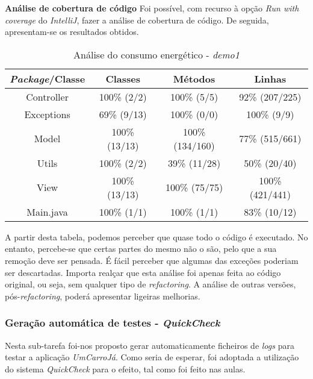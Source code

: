 \documentclass[a4paper]{report}
\begin{document}
\textbf{Análise de cobertura de código}
Foi possível, com recurso à opção \textit{Run with coverage} do \textit{IntelliJ}, fazer a análise de cobertura de código.
De seguida, apresentam-se os resultados obtidos.

\begin{table}[h] 
    \caption{Análise do consumo energético - \textit{demo1}}
    \begin{center}
        \begin{tabular}{ || c | c | c | c || }
        \hline
        \textbf{\textit{Package}/Classe} & \textbf{Classes} & \textbf{Métodos} & \textbf{Linhas} \\
        \hline
        \hline
        Controller & 100\% (2/2) & 100\% (5/5) & 92\% (207/225) \\
        \hline
        Exceptions & 69\% (9/13) & 100\% (0/0) & 100\% (9/9) \\
        \hline
        Model & 100\% (13/13) & 100\% (134/160) & 77\% (515/661) \\
        \hline
        Utils & 100\% (2/2) & 39\% (11/28) & 50\% (20/40) \\
        \hline
        View & 100\% (13/13) & 100\% (75/75) & 100\% (421/441) \\
        \hline
        Main.java & 100\% (1/1) & 100\% (1/1) & 83\% (10/12) \\
        \hline
        \end{tabular} 
    \end{center}
\end{table}

A partir desta tabela, podemos perceber que quase todo o código é executado. No entanto, percebe-se que certas partes do mesmo não o são, pelo que a sua remoção deve ser pensada.
É fácil perceber que algumas das exceções poderiam ser descartadas. Importa realçar que esta análise foi apenas feita ao código original, ou seja, sem qualquer tipo de \textit{refactoring}. 
A análise de outras versões, pós-\textit{refactoring}, poderá apresentar ligeiras melhorias.

\subsubsection{Geração automática de testes - \textit{QuickCheck}} \label{sssec:QuickCheckDemo1}
Nesta sub-tarefa foi-nos proposto gerar automaticamente ficheiros de \textit{logs} para testar a aplicação \textit{UmCarroJá}. Como seria de esperar, foi adoptada a utilização do sistema \textit{QuickCheck} para o efeito, tal como foi feito nas aulas.
\end{document}

